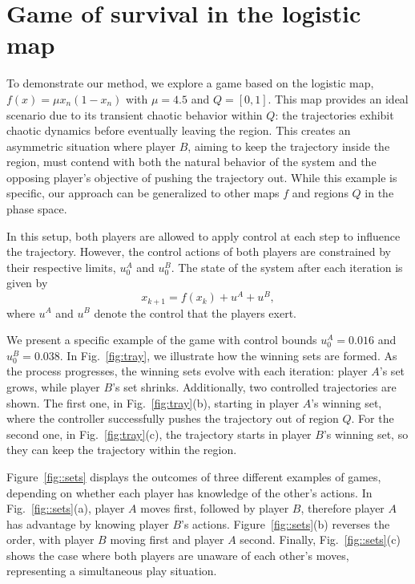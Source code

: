 


\section{Game of survival in the logistic map}

To demonstrate our method, we explore a game based on the logistic map, \linebreak ${f(x) = \mu x_n(1-x_n)}$ with $\mu=4.5$ and $Q=[0,1]$. This map provides an ideal scenario due to its transient chaotic behavior within $Q$: the trajectories exhibit chaotic dynamics before eventually leaving the region. This creates an asymmetric situation where player $B$, aiming to keep the trajectory inside the region, must contend with both the natural behavior of the system and the opposing player’s objective of pushing the trajectory out. While this example is specific, our approach can be generalized to other maps $f$ and regions $Q$ in the phase space.

In this setup, both players are allowed to apply control at each step to influence the trajectory. However, the control actions of both players are constrained by their respective limits, $u_0^A$ and $u_0^B$. The state of the system after each iteration is given by
\begin{equation}
x_{k+1} = f(x_k) + u^A + u^B,
\end{equation}
where $u^A$ and $u^B$ denote the control that the players exert.

We present a specific example of the game with control bounds $u_0^A = 0.016$ and $u_0^B = 0.038$. In Fig.~\ref{fig:tray}, we illustrate how the winning sets are formed. As the process progresses, the winning sets evolve with each iteration: player $A$’s set grows, while player $B$’s set shrinks. Additionally, two controlled trajectories are shown. The first one, in Fig.~\ref{fig:tray}(b), starting in player $A$’s winning set, where the controller successfully pushes the trajectory out of region $Q$. For the second one, in Fig.~\ref{fig:tray}(c), the trajectory starts in player $B$’s winning set, so they can keep the trajectory within the region.

Figure~\ref{fig::sets} displays the outcomes of three different examples of games, depending on whether each player has knowledge of the other’s actions. In Fig.~\ref{fig::sets}(a), player $A$ moves first, followed by player $B$, therefore player $A$ has advantage by knowing player $B$'s actions. Figure~\ref{fig::sets}(b) reverses the order, with player $B$ moving first and player $A$ second. Finally, Fig.~\ref{fig::sets}(c) shows the case where both players are unaware of each other’s moves, representing a simultaneous play situation.

